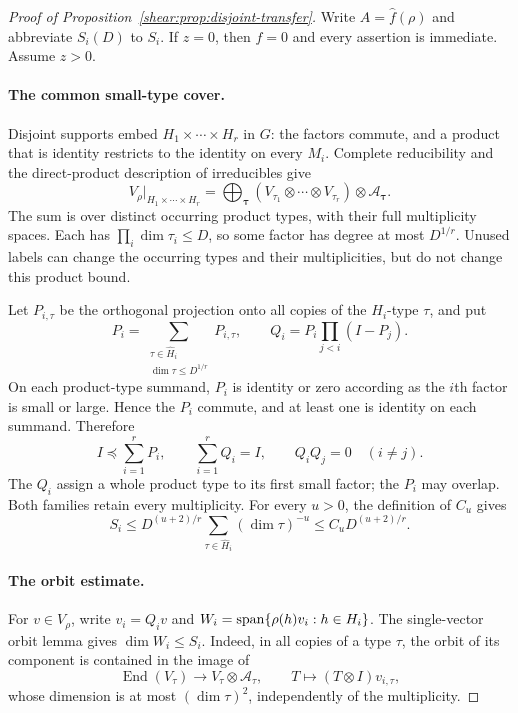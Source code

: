 \begin{proof}[Proof of Proposition~\ref{shear:prop:disjoint-transfer}]
Write \(A=\widehat f(\rho)\) and abbreviate \(S_i(D)\) to \(S_i\).
If \(z=0\), then \(f=0\) and every assertion is immediate. Assume \(z>0\).

\paragraph{The common small-type cover.}
Disjoint supports embed \(H_1\times\cdots\times H_r\) in \(G\):
the factors commute, and a product that is identity restricts to the
identity on every \(M_i\). Complete reducibility and the
direct-product description of irreducibles
\cite[Theorems~3.12 and~4.25 and Proposition~3.14]{etingof} give
\[
 V_\rho\big|_{H_1\times\cdots\times H_r}
 =
 \bigoplus_{\boldsymbol\tau}
 (V_{\tau_1}\otimes\cdots\otimes V_{\tau_r})
       \otimes\mathcal A_{\boldsymbol\tau}.
\]
The sum is over distinct occurring product types, with their full
multiplicity spaces. Each has
\(\prod_i\dim\tau_i\le D\), so some factor has degree at most
\(D^{1/r}\). Unused labels can change the occurring types and their
multiplicities, but do not change this product bound.

Let \(P_{i,\tau}\) be the orthogonal projection onto all copies of
the \(H_i\)-type \(\tau\), and put
\[
 P_i=\sum_{\substack{\tau\in\widehat H_i\\
                         \dim\tau\le D^{1/r}}}P_{i,\tau},
 \qquad Q_i=P_i\prod_{j<i}(I-P_j).
\]
On each product-type summand, \(P_i\) is identity or zero according
as the \(i\)th factor is small or large. Hence the \(P_i\) commute,
and at least one is identity on each summand. Therefore
\begin{equation}
 I\preceq\sum_{i=1}^rP_i,\qquad
 \sum_{i=1}^rQ_i=I,\qquad Q_iQ_j=0\quad(i\ne j).
 \label{shear:eq:disjoint-projector-cover}
\end{equation}
The \(Q_i\) assign a whole product type to its first small factor;
the \(P_i\) may overlap. Both families retain every multiplicity.
For every \(u>0\), the definition of \(C_u\) gives
\[
 S_i\le D^{(u+2)/r}
       \sum_{\tau\in\widehat H_i}(\dim\tau)^{-u}
 \le C_uD^{(u+2)/r}.
\]

\paragraph{The orbit estimate.}
For \(v\in V_\rho\), write \(v_i=Q_iv\) and
\(W_i=\operatorname{span}\{\rho(h)v_i:h\in H_i\}\). The single-vector orbit lemma
\cite[Lemma~]{partial-fourier} gives
\(\dim W_i\le S_i\). Indeed, in all copies of a type \(\tau\), the
orbit of its component is contained in the image of
\[
 \operatorname{End}(V_\tau)\longrightarrow
 V_\tau\otimes\mathcal A_\tau,\qquad
 T\longmapsto(T\otimes I)v_{i,\tau},
\]
whose dimension is at most \((\dim\tau)^2\), independently of the
multiplicity.


\end{proof}
